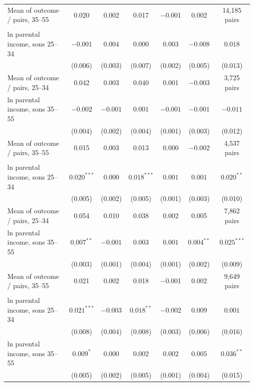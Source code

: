 \begin{table}[!htbp]
{{\begin{tabular}{lcccccc}
\quad Mean of outcome / pairs, 35--55 & 0.020 & 0.002 & 0.017 & $-$0.001 & 0.002 & 14,185 pairs \\
\addlinespace
\multicolumn{7}{l}{\textit{Black}} \\
ln parental income, sons 25--34 & $-0.001$ & $0.004$ & $0.000$ & $0.003$ & $-0.008$ & $0.018$ \\
 & (0.006) & (0.003) & (0.007) & (0.002) & (0.005) & (0.013) \\
\quad Mean of outcome / pairs, 25--34 & 0.042 & 0.003 & 0.040 & 0.001 & $-$0.003 & 3,725 pairs \\
ln parental income, sons 35--55 & $-0.002$ & $-0.001$ & $0.001$ & $-0.001$ & $-0.001$ & $-0.011$ \\
 & (0.004) & (0.002) & (0.004) & (0.001) & (0.003) & (0.012) \\
\quad Mean of outcome / pairs, 35--55 & 0.015 & 0.003 & 0.013 & 0.000 & $-$0.002 & 4,537 pairs \\
\addlinespace
\multicolumn{7}{l}{\textit{White}} \\
ln parental income, sons 25--34 & $0.020^{***}$ & $0.000$ & $0.018^{***}$ & $0.001$ & $0.001$ & $0.020^{**}$ \\
 & (0.005) & (0.002) & (0.005) & (0.001) & (0.003) & (0.010) \\
\quad Mean of outcome / pairs, 25--34 & 0.054 & 0.010 & 0.038 & 0.002 & 0.005 & 7,862 pairs \\
ln parental income, sons 35--55 & $0.007^{**}$ & $-0.001$ & $0.003$ & $0.001$ & $0.004^{**}$ & $0.025^{***}$ \\
 & (0.003) & (0.001) & (0.004) & (0.001) & (0.002) & (0.009) \\
\quad Mean of outcome / pairs, 35--55 & 0.021 & 0.002 & 0.018 & $-$0.001 & 0.002 & 9,649 pairs \\
\addlinespace
\multicolumn{7}{l}{\textit{White $-$ Black}} \\
ln parental income, sons 25--34 & $0.021^{***}$ & $-0.003$ & $0.018^{**}$ & $-0.002$ & $0.009$ & $0.001$ \\
 & (0.008) & (0.004) & (0.008) & (0.003) & (0.006) & (0.016) \\
ln parental income, sons 35--55 & $0.009^{*}$ & $0.000$ & $0.002$ & $0.002$ & $0.005$ & $0.036^{**}$ \\
 & (0.005) & (0.002) & (0.005) & (0.001) & (0.004) & (0.015) \\
\bottomrule
\end{tabular}}}
\par\smallskip

\end{table}
